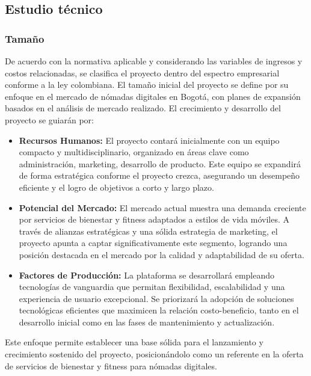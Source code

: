 \subsection{Estudio técnico}

{\color{red}
\subsubsection*{Tamaño}
De acuerdo con la normativa aplicable y considerando las variables de ingresos y costos relacionadas, se clasifica el proyecto dentro del espectro empresarial conforme a la ley colombiana. El tamaño inicial del proyecto se define por su enfoque en el mercado de nómadas digitales en Bogotá, con planes de expansión basados en el análisis de mercado realizado. El crecimiento y desarrollo del proyecto se guiarán por:

\begin{itemize}
    \item \textbf{Recursos Humanos:} El proyecto contará inicialmente con un equipo compacto y multidisciplinario, organizado en áreas clave como administración, marketing, desarrollo de producto. Este equipo se expandirá de forma estratégica conforme el proyecto crezca, asegurando un desempeño eficiente y el logro de objetivos a corto y largo plazo.
    
    \item \textbf{Potencial del Mercado:} El mercado actual muestra una demanda creciente por servicios de bienestar y fitness adaptados a estilos de vida móviles. A través de alianzas estratégicas y una sólida estrategia de marketing, el proyecto apunta a captar significativamente este segmento, logrando una posición destacada en el mercado por la calidad y adaptabilidad de su oferta.
    
    \item \textbf{Factores de Producción:} La plataforma se desarrollará empleando tecnologías de vanguardia que permitan flexibilidad, escalabilidad y una experiencia de usuario excepcional. Se priorizará la adopción de soluciones tecnológicas eficientes que maximicen la relación costo-beneficio, tanto en el desarrollo inicial como en las fases de mantenimiento y actualización.
\end{itemize}

Este enfoque permite establecer una base sólida para el lanzamiento y crecimiento sostenido del proyecto, posicionándolo como un referente en la oferta de servicios de bienestar y fitness para nómadas digitales.

}
